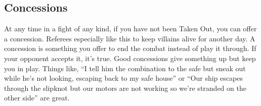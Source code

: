 \subsection{Concessions}\label{sec:Concessions} %

At any time in a fight of any kind, if you have not been Taken Out, you can offer a concession. Referees especially like this to keep villains alive for another day. A concession is something you offer to end the combat instead of play it through. If your opponent accepts it, it's true. Good concessions give something up but keep you in play. Things like, ``I tell him the combination to the safe but sneak out while he's not looking, escaping back to my safe house'' or ``Our ship escapes through the slipknot but our motors are not working so we're stranded on the other side'' are great.

